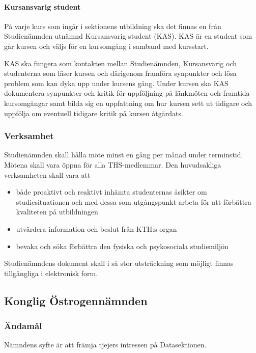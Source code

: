 \documentclass{dgovdoc}
\begin{document}
\paragraph{Kursansvarig student}

På varje kurs som ingår i sektionens utbildning ska det finnas en från Studienämnden
utnämnd Kursansvarig student (KAS). KAS är en student som går kursen och väljs för
en kursomgång i samband med kursstart.

KAS ska fungera som kontakten mellan Studienämnden, Kursansvarig och studenterna
som läser kursen och därigenom framföra synpunkter och lösa problem som kan dyka
upp under kursens gång. Under kursen ska KAS dokumentera synpunkter och kritik för
uppföljning på länkmöten och framtida kursomgångar samt bilda sig en uppfattning om
hur kursen sett ut tidigare och uppfölja om eventuell tidigare kritik på kursen åtgärdats.


\subsubsection{Verksamhet}

Studienämnden skall hålla möte minst en gång per månad under terminstid. Mötena
skall vara öppna för alla THS-medlemmar. Den huvudsakliga verksamheten skall vara
att
\begin{itemize}
	\item både proaktivt och reaktivt inhämta studenternas åsikter om studiesituationen och med dessa som utgångspunkt arbeta för att förbättra kvaliteten på utbildningen
	\item utvärdera information och beslut från KTH:s organ
	\item bevaka och söka förbättra den fysiska och psykosociala studiemiljön
\end{itemize}

Studienämndens dokument skall i så stor utsträckning som möjligt finnas tillgängliga i
elektronisk form.

\subsection{Konglig Östrogennämnden}

\subsubsection{Ändamål}

Nämndens syfte är att främja tjejers intressen på Datasektionen.
\end{document}
